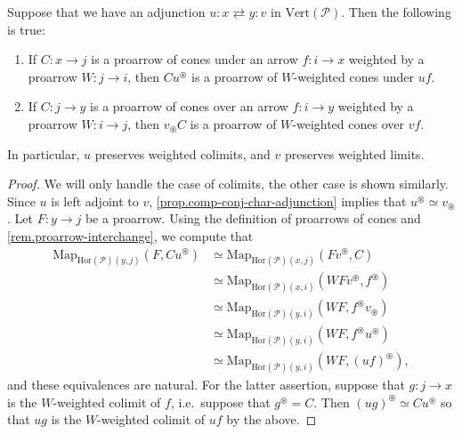 \documentclass[a4paper, 11pt]{amsart}
\numberwithin{theorem}{section}
\theoremstyle{definition}
\newcommand{\map}{\mathrm{Map}}
\renewcommand{\P}{\mathscr{P}}
\renewcommand{\Vert}{\mathrm{Vert}}
\newcommand{\Hor}{\mathrm{Hor}}
\begin{document}
\begin{proposition}\label{prop.cones-adjunctions}
Suppose that we have an adjunction 
$u : x \rightleftarrows y : v$
in $\Vert(\P)$. Then the following is true:
\begin{enumerate}
	\item If $C : x\rightarrow j$ is a proarrow of cones under an arrow $f : i \rightarrow x$ weighted by a proarrow $W : j \rightarrow i$, then $Cu^\circledast$ is 
	a  proarrow of $W$-weighted cones under $uf$.
	\item If $C : j \rightarrow y$ is a proarrow of cones over an arrow $f : i \rightarrow y$ weighted by a proarrow $W : i \rightarrow j$, 
	then $v_\circledast C$ is a proarrow
	of $W$-weighted cones over $vf$.
\end{enumerate}
In particular, $u$ preserves weighted colimits, and $v$ preserves weighted limits.
\end{proposition}
\begin{proof}
We will only handle the case of colimits, the other case is shown similarly. Since $u$ is left adjoint to $v$, \cref{prop.comp-conj-char-adjunction}
implies that $u^\circledast \simeq v_\circledast$. Let $F : y \rightarrow j$ be a proarrow. Using the definition of proarrows of cones 
and  \cref{rem.proarrow-interchange}, we compute that
\begin{align*}
\map_{\Hor(\P)(y,j)}(F, Cu^\circledast) & \simeq \map_{\Hor(\P)(x,j)}(Fv^\circledast, C) \\
&\simeq \map_{\Hor(\P)(x,i)}(WFv^\circledast, f^\circledast) \\
&\simeq \map_{\Hor(\P)(y,i)}(WF, f^\circledast v_\circledast) \\
&\simeq \map_{\Hor(\P)(y,i)}(WF, f^\circledast u^\circledast) \\
&\simeq \map_{\Hor(\P)(y,i)}(WF, (uf)^\circledast),
\end{align*}
and these equivalences are natural. 
For the latter assertion, suppose that $g : j \to x$ is the $W$-weighted colimit of $f$, i.e.\ suppose that $g^\circledast = C$. Then $(ug)^\circledast \simeq Cu^\circledast$ so that $ug$ is the $W$-weighted colimit of $uf$ by the above.
\end{proof}
\end{document}
